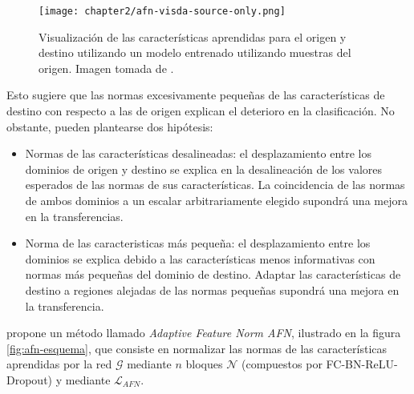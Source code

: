 \begin{figure}[H]
  \centering
  \texttt{[image: chapter2/afn-visda-source-only.png]}

  \caption[Representación de características aprendidas de una CNN]{Visualización de las características aprendidas para el origen y destino utilizando un modelo entrenado utilizando muestras del origen. Imagen tomada de \cite{xu2019larger}.}
  \label{fig:afn-source-only}
\end{figure}

Esto sugiere que las normas excesivamente pequeñas de las características de destino con respecto a las de origen
explican el deterioro en la clasificación. No obstante, pueden plantearse dos hipótesis:

\begin{itemize}
  \item Normas de las características desalineadas: el desplazamiento entre los dominios de origen y destino se explica en la
        desalineación de los valores esperados de las normas de sus características. La coincidencia de las normas de ambos
        dominios a un escalar arbitrariamente elegido supondrá una mejora en la transferencias.
  \item Norma de las caracteristicas más pequeña: el desplazamiento entre los dominios se explica debido a las características
        menos informativas con normas más pequeñas del dominio de destino. Adaptar las características de destino a regiones
        alejadas de las normas pequeñas supondrá una mejora en la transferencia.
\end{itemize}

\cite{xu2019larger} propone un método llamado {\it Adaptive Feature Norm AFN}, ilustrado en la figura \ref{fig:afn-esquema}, que consiste en normalizar las normas de las características aprendidas por la red $\mathcal{G}$ mediante $n$ bloques $\mathcal{N}$ (compuestos por FC-BN-ReLU-Dropout) y mediante $\mathcal{L}_{AFN}$.

